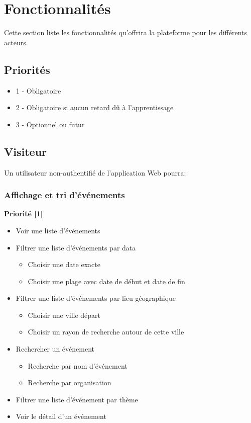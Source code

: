 \documentclass[11pt, a4paper, french, twoside]{article}
\begin{document}
	\section{Fonctionnalités}
	\label{sec:fonctionnalites}
		Cette section liste les fonctionnalités qu'offrira la plateforme pour les différents acteurs. 
		
		\subsection{Priorités}
		\label{subsec:priorites}
		
		\begin{itemize}
			\item 1 - Obligatoire
			\item 2 - Obligatoire si aucun retard dû à l'apprentissage
			\item 3 - Optionnel ou futur
		\end{itemize}
		
		\subsection{Visiteur}
		\label{subsec:visiteur}
			Un utilisateur non-authentifié de l'application Web pourra: 
			
			\subsubsection{Affichage et tri d'événements}
			\label{subsubsec:affichage_tri_evenements}
				
				\textbf{Priorité [1]}
			
				\begin{itemize}
					\item Voir une liste d'événements
					\item Filtrer une liste d'événements par data
						\begin{itemize}
							\item Choisir une date exacte
							\item Choisir une plage avec date de début et date de fin
						\end{itemize}
					\item Filtrer une liste d'événements par lieu géographique
						\begin{itemize}
							\item Choisir une ville départ
							\item Choisir un rayon de recherche autour de cette ville
						\end{itemize}
					\item Rechercher un événement
						\begin{itemize}
							\item Recherche par nom d'événement
							\item Recherche par organisation
						\end{itemize}
					\item Filtrer une liste d'événement par thème
					\item Voir le détail d'un événement
				\end{itemize}
			
\end{document}
